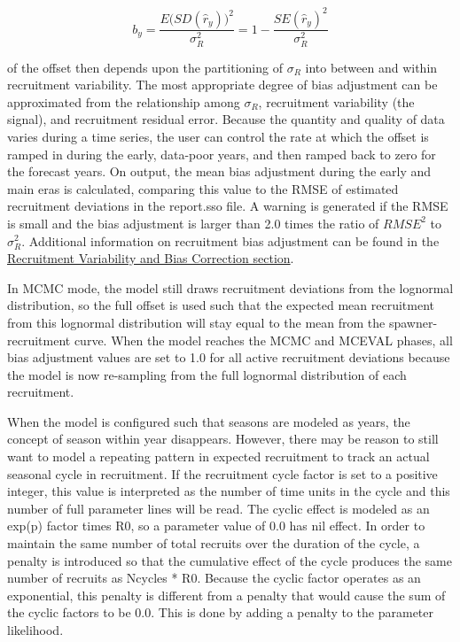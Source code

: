 \begin{equation}
	b_y=\frac{E\Big( SD(\hat{r}_y)\Big)^2}{\sigma^2_R}=1-\frac{SE(\hat{r}_y)^2}{\sigma^2_R}
\end{equation}

\noindent of the offset then depends upon the partitioning of $\sigma_R$ into between and within recruitment variability. The most appropriate degree of bias adjustment can be approximated from the relationship among $\sigma_R$, recruitment variability (the signal), and recruitment residual error. Because the quantity and quality of data varies during a time series, the user can control the rate at which the offset is ramped in during the early, data-poor years, and then ramped back to zero for the forecast years. On output, the mean bias adjustment during the early and main eras is calculated, comparing this value to the RMSE of estimated recruitment deviations in the report.sso file. A warning is generated if the RMSE is small and the bias adjustment is larger than 2.0 times the ratio of $RMSE^2$ to $\sigma^2_R$. Additional information on recruitment bias adjustment can be found in the \hyperlink{BiasCorrect}{Recruitment Variability and Bias Correction section}.

In MCMC mode, the model still draws recruitment deviations from the lognormal distribution, so the full offset is used such that the expected mean recruitment from this lognormal distribution will stay equal to the mean from the spawner-recruitment curve. When the model reaches the MCMC and MCEVAL phases, all bias adjustment values are set to 1.0 for all active recruitment deviations because the model is now re-sampling from the full lognormal distribution of each recruitment.

When the model is configured such that seasons are modeled as years, the concept of season within year disappears. However, there may be reason to still want to model a repeating pattern in expected recruitment to track an actual seasonal cycle in recruitment. If the recruitment cycle factor is set to a positive integer, this value is interpreted as the number of time units in the cycle and this number of full parameter lines will be read. The cyclic effect is modeled as an exp(p) factor times R0, so a parameter value of 0.0 has nil effect. In order to maintain the same number of total recruits over the duration of the cycle, a penalty is introduced so that the cumulative effect of the cycle produces the same number of recruits as Ncycles * R0. Because the cyclic factor operates as an exponential, this penalty is different from a penalty that would cause the sum of the cyclic factors to be 0.0. This is done by adding a penalty to the parameter likelihood. %

